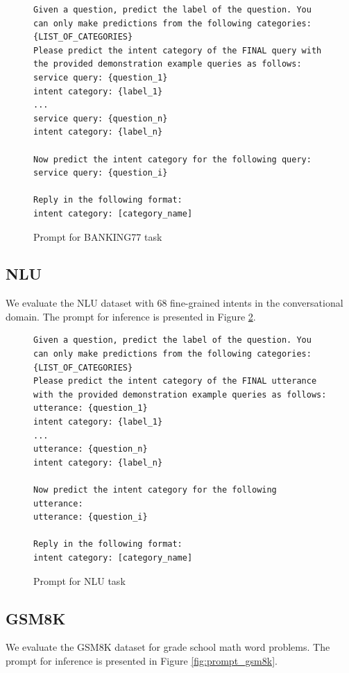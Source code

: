 \documentclass{llmxive}
\begin{document}
\begin{figure}[ht]
    \centering
    {\tiny
\begin{lstlisting}
Given a question, predict the label of the question. You can only make predictions from the following categories: {LIST_OF_CATEGORIES}
Please predict the intent category of the FINAL query with the provided demonstration example queries as follows:
service query: {question_1}
intent category: {label_1}
...
service query: {question_n}
intent category: {label_n}

Now predict the intent category for the following query:
service query: {question_i}

Reply in the following format:
intent category: [category_name]
\end{lstlisting}
}
    \caption{Prompt for BANKING77 task}
    \label{fig:prompt_banking77}
\end{figure}



\subsection{NLU}
We evaluate the NLU dataset with 68 fine-grained intents in the conversational domain. The prompt for inference is presented in Figure \ref{fig:prompt_nlu}. %

\begin{figure}[ht]
    \centering
    {\tiny
\begin{lstlisting}
Given a question, predict the label of the question. You can only make predictions from the following categories: {LIST_OF_CATEGORIES}
Please predict the intent category of the FINAL utterance with the provided demonstration example queries as follows:
utterance: {question_1}
intent category: {label_1}
...
utterance: {question_n}
intent category: {label_n}

Now predict the intent category for the following utterance:
utterance: {question_i}

Reply in the following format:
intent category: [category_name]
\end{lstlisting}
}
    \caption{Prompt for NLU task}
    \label{fig:prompt_nlu}
\end{figure}




\subsection{GSM8K}
We evaluate the GSM8K dataset for grade school math word problems. The prompt for inference is presented in Figure \ref{fig:prompt_gsm8k}. %
\end{document}

